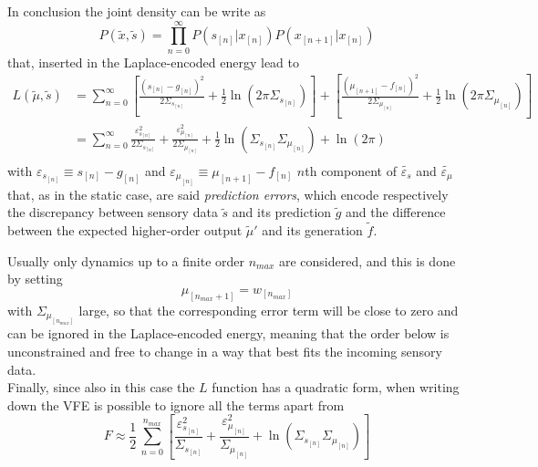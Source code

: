 \documentclass[a4paper, 10pt]{article}
\begin{document}
In conclusion the joint density can be write as
\begin{equation}
P(\tilde{x}, \tilde{s}) = \prod_{n=0}^{\infty} P(s_{[n]} | x_{[n]}) P(x_{[n+1]} | x_{[n]})
\end{equation}
that, inserted in the Laplace-encoded energy lead to 
\begin{equation}
\begin{split}
L(\tilde{\mu}, \tilde{s}) &= \sum_{n=0}^{\infty} \left[ \frac{(s_{[n]}-g_{[n]})^2}{2 \Sigma_{s_{[n]}}} + \frac{1}{2} \ln (2 \pi \Sigma_{s_{[n]}}) \right] + \left[ \frac{(\mu_{[n+1]}-f_{[n]})^2}{2 \Sigma_{\mu_{[n]}}} + \frac{1}{2} \ln (2 \pi \Sigma_{\mu_{[n]}}) \right] \\
	&= \sum_{n=0}^{\infty} \frac{\varepsilon_{s_{[n]}}^2}{2 \Sigma_{s_{[n]}}} + \frac{\varepsilon_{\mu_{[n]}}^2}{2 \Sigma_{\mu_{[n]}}} + \frac{1}{2} \ln (\Sigma_{s_{[n]}}\Sigma_{\mu_{[n]}}) + \ln(2 \pi)\\
\end{split}
\end{equation}
with $\varepsilon_{s_{[n]}} \equiv s_{[n]}-g_{[n]}$ and $\varepsilon_{\mu_{[n]}} \equiv \mu_{[n+1]}-f_{[n]}$ $n$th component of $\tilde{\varepsilon_{s}}$ and $\tilde{\varepsilon_{\mu}}$ that, as in the static case, are said \emph{prediction errors}, which encode respectively the discrepancy between sensory data $\tilde{s}$ and its prediction $\tilde{g}$ and the difference between the expected higher-order output $\tilde{\mu}'$ and its generation $\tilde{f}$.

Usually only dynamics up to a finite order $n_{max}$ are considered, and this is done by setting 
\begin{equation}
\mu_{[n_{max}+1]} = w_{[n_{max}]}
\end{equation}
with $\Sigma_{\mu_{[n_{max}]}}$ large, so that the corresponding error term will be close to zero and can be ignored in the Laplace-encoded energy, meaning that the order below is unconstrained and free to change in a way that best fits the incoming sensory data.\\
Finally, since also in this case the $L$ function has a quadratic form, when writing down the VFE is possible to ignore all the terms apart from
\begin{equation}
F \approx \frac{1}{2} \, \sum_{n=0}^{n_{max}} \left[ \frac{\varepsilon_{s_{[n]}}^2}{ \Sigma_{s_{[n]}}} + \frac{\varepsilon_{\mu_{[n]}}^2}{\Sigma_{\mu_{[n]}}} + \ln (\Sigma_{s_{[n]}}\Sigma_{\mu_{[n]}}) \right]
\end{equation}
\end{document}
